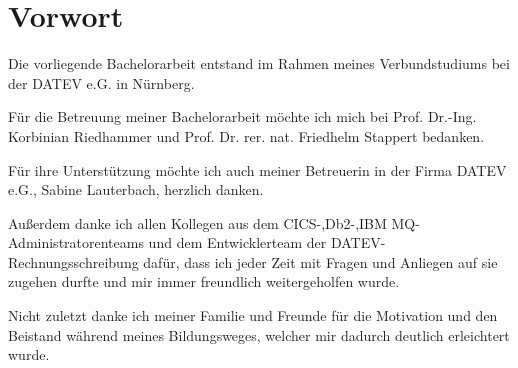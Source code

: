 \newpage
\section*{Vorwort}
Die vorliegende Bachelorarbeit entstand im Rahmen meines Verbundstudiums bei der DATEV e.G. in Nürnberg.

Für die Betreuung meiner Bachelorarbeit möchte ich mich bei Prof. Dr.-Ing. Korbinian Riedhammer und Prof. Dr. rer. nat. Friedhelm Stappert bedanken.

Für ihre Unterstützung möchte ich auch meiner Betreuerin in der Firma DATEV e.G., Sabine Lauterbach,  herzlich danken.

Außerdem danke ich allen Kollegen aus dem CICS-,Db2-,IBM MQ-Administratorenteams und dem Entwicklerteam der DATEV-Rechnungsschreibung dafür, dass ich jeder Zeit mit Fragen und Anliegen auf sie zugehen durfte und mir immer freundlich weitergeholfen wurde.

Nicht zuletzt danke ich meiner Familie und Freunde für die Motivation und den Beistand während meines Bildungsweges, welcher mir dadurch deutlich erleichtert wurde.

